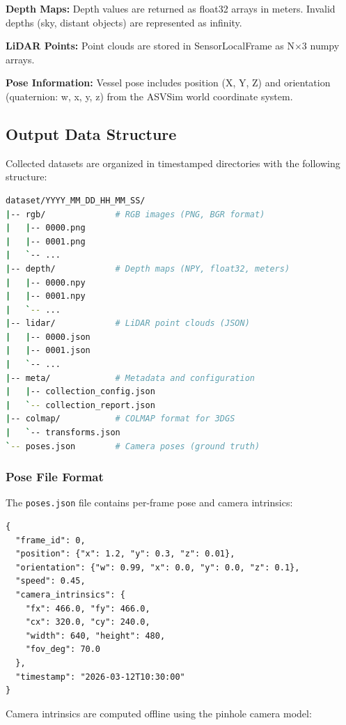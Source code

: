 \textbf{Depth Maps:} Depth values are returned as float32 arrays in meters. Invalid depths (sky, distant objects) are represented as infinity.

\textbf{LiDAR Points:} Point clouds are stored in SensorLocalFrame as N$\times$3 numpy arrays.

\textbf{Pose Information:} Vessel pose includes position (X, Y, Z) and orientation (quaternion: w, x, y, z) from the ASVSim world coordinate system.

\subsection{Output Data Structure}

Collected datasets are organized in timestamped directories with the following structure:

\begin{lstlisting}[language=bash, caption={Dataset Directory Structure}]
dataset/YYYY_MM_DD_HH_MM_SS/
|-- rgb/              # RGB images (PNG, BGR format)
|   |-- 0000.png
|   |-- 0001.png
|   `-- ...
|-- depth/            # Depth maps (NPY, float32, meters)
|   |-- 0000.npy
|   |-- 0001.npy
|   `-- ...
|-- lidar/            # LiDAR point clouds (JSON)
|   |-- 0000.json
|   |-- 0001.json
|   `-- ...
|-- meta/             # Metadata and configuration
|   |-- collection_config.json
|   `-- collection_report.json
|-- colmap/           # COLMAP format for 3DGS
|   `-- transforms.json
`-- poses.json        # Camera poses (ground truth)
\end{lstlisting}

\subsubsection{Pose File Format}

The \texttt{poses.json} file contains per-frame pose and camera intrinsics:

\begin{lstlisting}[language={}, caption={Pose JSON Structure}]
{
  "frame_id": 0,
  "position": {"x": 1.2, "y": 0.3, "z": 0.01},
  "orientation": {"w": 0.99, "x": 0.0, "y": 0.0, "z": 0.1},
  "speed": 0.45,
  "camera_intrinsics": {
    "fx": 466.0, "fy": 466.0,
    "cx": 320.0, "cy": 240.0,
    "width": 640, "height": 480,
    "fov_deg": 70.0
  },
  "timestamp": "2026-03-12T10:30:00"
}
\end{lstlisting}

Camera intrinsics are computed offline using the pinhole camera model:


